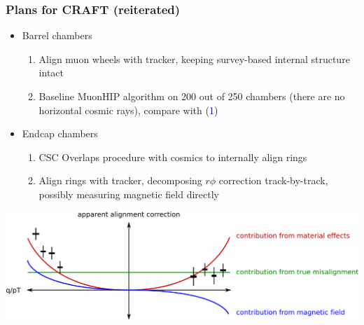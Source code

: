 \documentclass[compress]{beamer}
\begin{document}
\begin{frame}
\frametitle{Plans for CRAFT (reiterated)}
\small

\begin{itemize}
\item Barrel chambers
\begin{enumerate}
\item Align muon wheels with tracker, keeping survey-based internal structure intact
\item Baseline MuonHIP algorithm on 200 out of 250 chambers (there are no horizontal cosmic rays), compare with \textcolor{darkblue}{(1)}
\end{enumerate}
\item Endcap chambers
\begin{enumerate}
\item CSC Overlaps procedure with cosmics to internally align rings
\item Align rings with tracker, decomposing $r\phi$ correction track-by-track, possibly measuring magnetic field directly
\end{enumerate}
\end{itemize}

\includegraphics[width=\linewidth]{removing_magnetic_field.png}

\label{numpages}
\end{frame}
\end{document}
